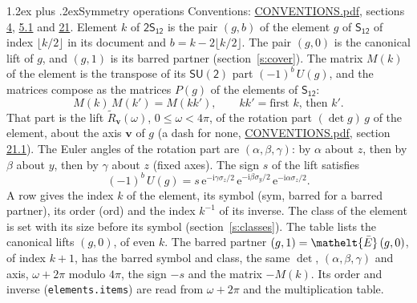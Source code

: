 \documentclass[10pt,a4paper]{article}
\makeatletter
\renewcommand\section{\@startsection{section}{1}{\z@}{-3ex plus -1ex minus -.2ex}%
  {1.2ex plus .2ex}{\normalfont\large\sffamily\bfseries\color{parttitle}}}
\numberwithin{equation}{section}
\newcommand{\eltfont}[1]{{\let\sigma\eltsigma\mathelt{#1}}}
\newcommand{\grp}[1]{\mathsf{#1}}
\newcommand{\elt}[1]{\eltfont{#1}}
\newcommand{\vv}{\mathbf{v}}
\newcommand{\iunit}{\mathrm{i}}
\newcommand{\expe}{\mathrm{e}}
\newcommand{\barred}[1]{\bar{#1}}
\newcommand{\lift}[1]{\tilde{#1}}
\newcommand{\pauli}[1]{\sigma_{#1}}
\makeatother
\begin{document}
\section{Symmetry operations}\label{s:elements}
Conventions: \href{../../CONVENTIONS.pdf}{CONVENTIONS.pdf}, sections \href{../../../rotation/CONVENTIONS.pdf\#conv.4}{4}, \href{../../../rotation/CONVENTIONS.pdf\#conv.5.1}{5.1} and \href{../../CONVENTIONS.pdf\#conv.21}{21}.
\leavevmode\label{n:index.element}\label{n:element.g}Element $k$ of $\grp{2S_{12}}$ is the pair $(g, b)$ of the element $g$ of \href{../../../rotation/data/pdf/S12.pdf}{$\grp{S_{12}}$} of index $\lfloor k/2\rfloor$ in its document and $b = k - 2\lfloor k/2\rfloor$. The pair $(g, 0)$ is the canonical lift of $g$, and $(g, 1)$ is its barred partner (section~\ref{s:cover}). \label{n:matrix.element.pin}\label{n:matrix.element}The matrix $M(k)$ of the element is the transpose of its $\grp{SU(2)}$ part $(-1)^{b}\,U(g)$, and the matrices compose as the matrices $P(g)$ of the elements of $\grp{S_{12}}$:
\begin{equation}\label{e:mprod}M(k)\,M(k') = M(kk'),\qquad kk' = \text{first } k\text{, then } k'.\end{equation}
\leavevmode\label{n:angle.omega}\label{n:vector.axis}\label{n:vector.pole}That part is the lift $\lift{R}_{\vv}(\omega)$, $0 \le \omega < 4\pi$, of the rotation part $(\det g)\,g$ of the element, about the axis $\vv$ of $g$ (a dash for none, \href{../../CONVENTIONS.pdf}{CONVENTIONS.pdf}, section \href{../../CONVENTIONS.pdf\#conv.21.1}{21.1}). \label{n:angle.euler.alpha}\label{n:angle.euler.beta}\label{n:angle.euler.gamma}\label{n:vector.coordinates}The Euler angles of the rotation part are $(\alpha,\beta,\gamma)$: by $\alpha$ about $z$, then by $\beta$ about $y$, then by $\gamma$ about $z$ (fixed axes). \label{n:local.euler.sign}The sign $s$ of the lift satisfies
\begin{equation}\label{e:euler}(-1)^{b}\,U(g) = s\,\expe^{-\iunit\gamma\pauli{z}/2}\,\expe^{-\iunit\beta\pauli{y}/2}\,\expe^{-\iunit\alpha\pauli{z}/2}.\end{equation}
\leavevmode\label{n:index.element.inverse}\label{n:head.sym}\label{n:head.ord}A row gives the index $k$ of the element, its symbol (sym, barred for a barred partner), its order (ord) and the index $k^{-1}$ of its inverse. \label{n:head.class}The class of the element is set with its size before its symbol (section~\ref{s:classes}).
The table lists the canonical lifts $(g, 0)$, of even $k$. The barred partner $(g, 1) = \elt{\barred{E}}\,(g, 0)$, of index $k + 1$, has the barred symbol and class, the same $\det$, $(\alpha,\beta,\gamma)$ and axis, $\omega + 2\pi$ modulo $4\pi$, the sign $-s$ and the matrix $-M(k)$. Its order and inverse (\texttt{elements.items}) are read from $\omega + 2\pi$ and the multiplication table.
\end{document}
